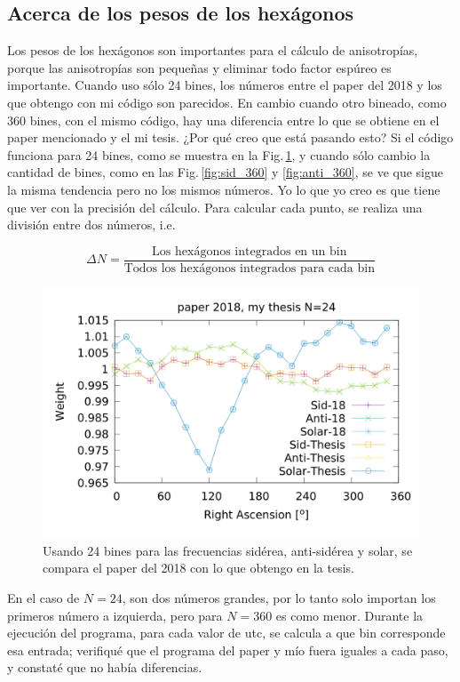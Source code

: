 \subsection{Acerca de los pesos de los hexágonos}

	Los pesos de los hexágonos son importantes para el cálculo de anisotropías, porque las anisotropías son pequeñas y eliminar todo factor espúreo es importante. Cuando uso sólo 24 bines, los números entre el paper del 2018 y los que obtengo con mi código son parecidos. En cambio cuando otro bineado, como 360 bines, con el mismo código, hay una diferencia entre lo que se obtiene en el paper mencionado y el mi tesis. ¿Por qué creo que está pasando esto? Si el código funciona para 24 bines, como se muestra en la Fig.\,\ref{fig:all_24}, y cuando sólo cambio la cantidad de bines, como en las Fig.\,\ref{fig:sid_360} y \ref{fig:anti_360}, se ve que sigue la misma tendencia pero no los mismos números. Yo lo que yo creo es que tiene que ver con la precisión del cálculo. Para calcular cada punto, se realiza una división entre dos números, i.e. 

	\begin{equation}
	\Delta N = \frac{\text{Los hexágonos integrados en un bin}}{\text{Todos los hexágonos integrados para cada bin}}
	\end{equation}


	\begin{figure}[H]
	\centering
	\includegraphics[width=0.8\linewidth]{Graficos/solar_anti_sid_my_and_paper_in_24.png} \caption{Usando 24 bines para las frecuencias sidérea, anti-sidérea y solar, se compara el paper del 2018 con lo que obtengo en la tesis.}
	\label{fig:all_24}
	\end{figure}


	En el caso de $N=24$, son dos números grandes, por lo tanto solo importan los primeros número a izquierda, pero para  $N=360$ es como menor. Durante la ejecución del programa, para cada valor de utc, se calcula a que bin corresponde esa entrada; verifiqué que el programa del paper y mío fuera iguales a cada paso, y constaté que no había diferencias.

